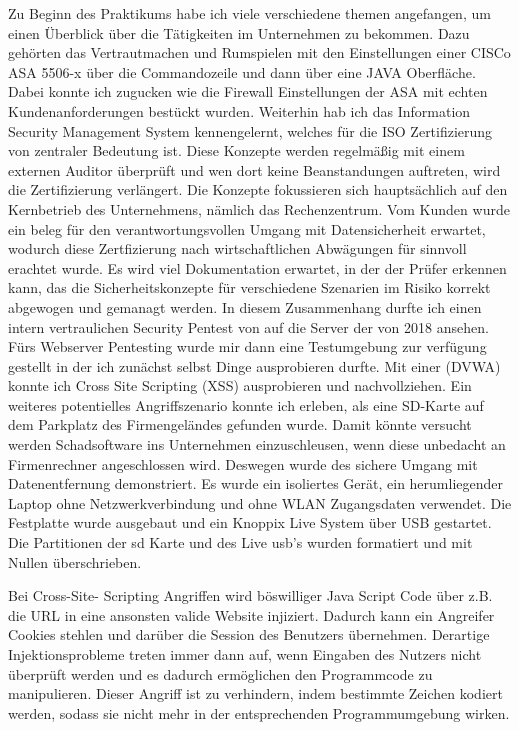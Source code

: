 \documentclass[english,runningheads,a4paper]{llncs}[2018/03/10]
\begin{document}
Zu Beginn des Praktikums habe ich viele verschiedene themen angefangen, um einen Überblick über die Tätigkeiten im Unternehmen zu bekommen. Dazu gehörten das Vertrautmachen und Rumspielen mit den Einstellungen einer CISCo ASA 5506-x über die Commandozeile und dann über eine JAVA Oberfläche. Dabei konnte ich zugucken wie die Firewall Einstellungen der ASA mit echten Kundenanforderungen bestückt wurden. Weiterhin hab ich das Information Security Management System kennengelernt, welches für die ISO Zertifizierung von zentraler Bedeutung ist. Diese Konzepte werden regelmäßig mit einem externen Auditor überprüft und wen dort keine Beanstandungen auftreten, wird die Zertifizierung verlängert. Die Konzepte fokussieren sich hauptsächlich auf den Kernbetrieb des Unternehmens, nämlich das Rechenzentrum. Vom Kunden wurde ein beleg für den verantwortungsvollen Umgang mit Datensicherheit erwartet, wodurch diese Zertfizierung nach wirtschaftlichen Abwägungen für sinnvoll erachtet wurde. Es wird viel Dokumentation erwartet, in der der Prüfer erkennen kann, das die Sicherheitskonzepte für verschiedene Szenarien im Risiko korrekt abgewogen und gemanagt werden. 
In diesem Zusammenhang durfte ich einen intern vertraulichen Security Pentest von  auf die Server der  von 2018 ansehen. Fürs Webserver Pentesting wurde mir dann eine Testumgebung zur verfügung gestellt in der ich zunächst selbst Dinge ausprobieren durfte. Mit einer  (DVWA) konnte ich Cross Site Scripting (XSS) ausprobieren und nachvollziehen.
Ein weiteres potentielles Angriffszenario konnte ich erleben, als eine SD-Karte auf dem Parkplatz des Firmengeländes gefunden wurde. Damit könnte versucht werden Schadsoftware ins Unternehmen einzuschleusen, wenn diese unbedacht an Firmenrechner angeschlossen wird. Deswegen wurde des sichere Umgang mit Datenentfernung demonstriert. Es wurde ein isoliertes Gerät, ein herumliegender Laptop ohne Netzwerkverbindung und ohne WLAN Zugangsdaten verwendet. Die Festplatte wurde ausgebaut und ein Knoppix Live System über USB gestartet. Die Partitionen der sd Karte und des Live usb's wurden formatiert und mit Nullen überschrieben.

Bei Cross-Site- Scripting Angriffen wird böswilliger Java Script Code über z.B. die URL in eine ansonsten valide Website injiziert. Dadurch kann ein Angreifer Cookies stehlen und darüber die Session des Benutzers übernehmen. Derartige Injektionsprobleme treten immer dann auf, wenn Eingaben des Nutzers nicht überprüft werden und es dadurch ermöglichen den Programmcode zu manipulieren. Dieser Angriff ist zu verhindern, indem bestimmte Zeichen kodiert werden, sodass sie nicht mehr in der entsprechenden Programmumgebung wirken.
\end{document}
